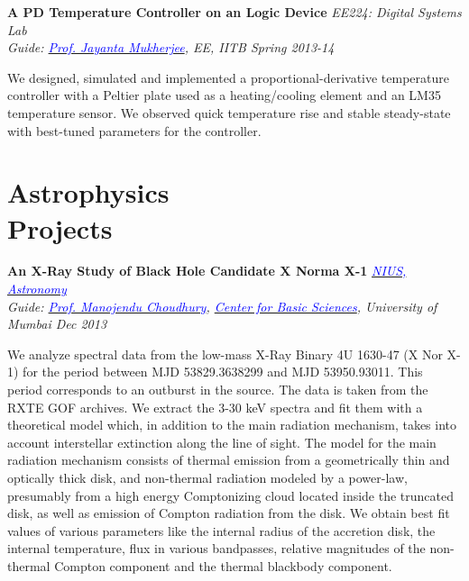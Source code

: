 \documentclass[margin,line]{res}
\newenvironment{list1}{
  \begin{list}{\ding{113}}{%
      \setlength{\itemsep}{0in}
      \setlength{\parsep}{0in} \setlength{\parskip}{0in}
      \setlength{\topsep}{0in} \setlength{\partopsep}{0in} 
      \setlength{\leftmargin}{0.17in}}}{\end{list}}
\begin{document}
\begin{resume}
\vspace*{-0.1in}

{\bf A PD Temperature Controller on an Logic Device} \hfill \textit{EE224: Digital Systems Lab} \\
{\em Guide: \href{https://www.ee.iitb.ac.in/wiki/faculty/jayanta}{\textcolor{blue}{Prof. Jayanta Mukherjee}}, EE, IITB \hfill Spring 2013-14} \\
\vspace*{-.15in}
\begin{list1}
\item[] We designed, simulated and implemented a proportional-derivative temperature controller with a Peltier plate used as a heating/cooling element and an LM35 temperature sensor. We observed quick temperature rise and stable steady-state with best-tuned parameters for the controller.
\end{list1}

\vspace*{-0.1in}

\section{\sc Astrophysics \\Projects}

{\bf An X-Ray Study of Black Hole Candidate X Norma X-1} \hfill \textit{\href{http://nius.hbcse.tifr.res.in/}{\textcolor{blue} {NIUS, Astronomy}}} \\
{\em Guide: \href{http://cbs.ac.in/people/visiting-scientists/manojendu-choudhury}{\textcolor{blue}{Prof. Manojendu Choudhury}}, \href{http://cbs.ac.in/}{\textcolor{blue} {Center for Basic Sciences}}, University of Mumbai \hfill Dec 2013}
\vspace*{-.15in}
\begin{list1}
\item[] We analyze spectral data from the low-mass X-Ray Binary 4U 1630-47 (X Nor X-1) for the period between MJD 53829.3638299 and MJD 53950.93011. This period corresponds to an outburst in the source. The data is taken from the RXTE GOF archives. We extract the 3-30 keV spectra and fit them with a theoretical model which, in addition to the main radiation mechanism, takes into account interstellar extinction along the line of sight. The model for the main radiation mechanism consists of thermal emission from a geometrically thin and optically thick disk, and non-thermal radiation modeled by a power-law, presumably from a high energy Comptonizing cloud located inside the truncated disk, as well as emission of Compton radiation from the disk. We obtain best fit values of various parameters like the internal radius of the accretion disk, the internal temperature, flux in various bandpasses, relative magnitudes of the non-thermal Compton component and the thermal blackbody component.
\end{list1}


\end{resume}
\end{document}
